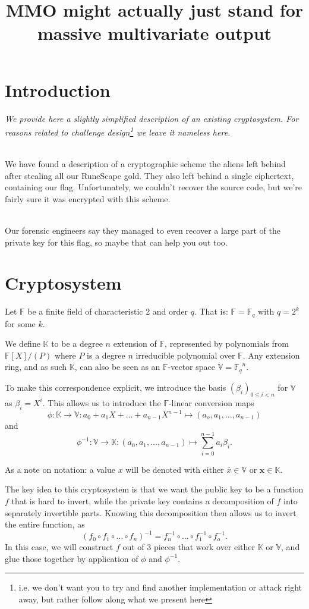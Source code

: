 \documentclass{article}
\title{MMO might actually just stand for massive multivariate output}
\newcommand{\F}{\ensuremath{\mathbb{F}}}
\newcommand{\Fq}{\ensuremath{\F_q}}
\newcommand{\K}{\ensuremath{\mathbb{K}}}
\newcommand{\V}{\ensuremath{\mathbb{V}}}
\newcommand{\vv}[1]{\ensuremath{\bar{#1}}}
\newcommand{\kk}[1]{\ensuremath{\mathbf{#1}}}
\begin{document}
\setlength{\parindent}{0px}

\section{Introduction}

\emph{We provide here a slightly simplified description of an existing cryptosystem.
For reasons related to challenge design\footnote{i.e. we don't want you to try and find another implementation or attack right away, but rather follow along what we present here}
we leave it nameless here.}

~\\
We have found a description of a cryptographic scheme the aliens left behind after stealing all our RuneScape gold.
They also left behind a single ciphertext, containing our flag.
Unfortunately, we couldn't recover the source code, but we're fairly sure it was encrypted with this scheme.

~\\
Our forensic engineers say they managed to even recover a large part of the private key for this flag, so maybe that can help you out too.

\section{Cryptosystem}

Let $\F$ be a finite field of characteristic 2 and order $q$.
That is: $\F = \Fq$ with $q = 2^k$ for some $k$.

We define $\K$ to be a degree $n$ extension of $\F$, represented by polynomials from $\F[X]/(P)$ where $P$ is a degree $n$ irreducible polynomial over $\F$.
Any extension ring, and as such $\K$, can also be seen as an $\F$-vector space $\V = \Fq^n$.

To make this correspondence explicit, we introduce the basis $(\beta_i)_{0 \le i < n}$ for $\V$ as $\beta_i = X^i$.
This allows us to introduce the $\F$-linear conversion maps \[\phi : \K \to \V : a_0 + a_1 X + \dots + a_{n - 1} X^{n - 1} \mapsto (a_o, a_1, \dots, a_{n - 1})\] and \[\phi^{-1} : \V \to \K : (a_0, a_1, \dots, a_{n - 1}) \mapsto \sum_{i = 0}^{n - 1} a_i \beta_i.\]

As a note on notation: a value $x$ will be denoted with either $\vv{x} \in \V$ or $\kk{x} \in \K$.

The key idea to this cryptosystem is that we want the public key to be a function $f$ that is hard to invert, while the private key contains a decomposition of $f$ into separately invertible parts.
Knowing this decomposition then allows us to invert the entire function, as \[(f_0 \circ f_1 \circ \dots \circ f_n)^{-1} = f_n^{-1} \circ \dots \circ f_1^{-1} \circ f_o^{-1}.\]
In this case, we will construct $f$ out of 3 pieces that work over either $\K$ or $\V$, and glue those together by application of $\phi$ and $\phi^{-1}$.
\end{document}
